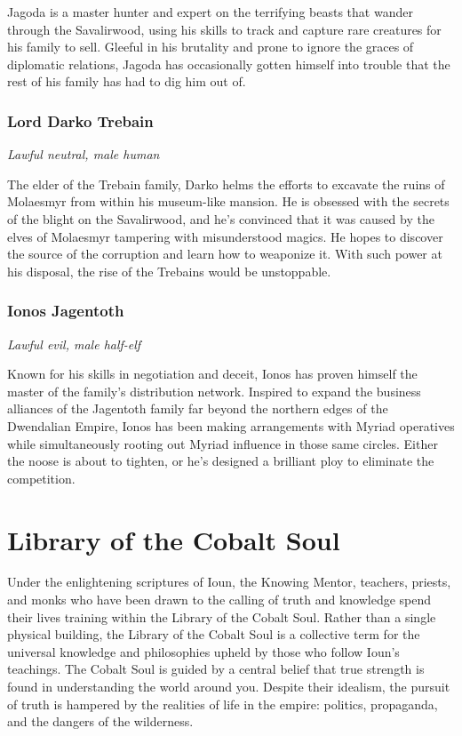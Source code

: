 \documentclass[10pt,a4paper,twoside,bg=print,twocolumn,openany,nodeprecatedcode]{dndbook}
\begin{document}
Jagoda is a master hunter and expert on the terrifying beasts that wander through the Savalirwood, using his skills to track and capture rare creatures for his family to sell. Gleeful in his brutality and prone to ignore the graces of diplomatic relations, Jagoda has occasionally gotten himself into trouble that the rest of his family has had to dig him out of.

\subsubsection{Lord Darko Trebain}
\textit{Lawful neutral, male human}

The elder of the Trebain family, Darko helms the efforts to excavate the ruins of Molaesmyr from within his museum-like mansion. He is obsessed with the secrets of the blight on the Savalirwood, and he's convinced that it was caused by the elves of Molaesmyr tampering with misunderstood magics. He hopes to discover the source of the corruption and learn how to weaponize it. With such power at his disposal, the rise of the Trebains would be unstoppable.

\subsubsection{Ionos Jagentoth}
\textit{Lawful evil, male half-elf}

Known for his skills in negotiation and deceit, Ionos has proven himself the master of the family's distribution network. Inspired to expand the business alliances of the Jagentoth family far beyond the northern edges of the Dwendalian Empire, Ionos has been making arrangements with Myriad operatives while simultaneously rooting out Myriad influence in those same circles. Either the noose is about to tighten, or he's designed a brilliant ploy to eliminate the competition.

\section{Library of the Cobalt Soul}
Under the enlightening scriptures of Ioun, the Knowing Mentor, teachers, priests, and monks who have been drawn to the calling of truth and knowledge spend their lives training within the Library of the Cobalt Soul. Rather than a single physical building, the Library of the Cobalt Soul is a collective term for the universal knowledge and philosophies upheld by those who follow Ioun's teachings. The Cobalt Soul is guided by a central belief that true strength is found in understanding the world around you. Despite their idealism, the pursuit of truth is hampered by the realities of life in the empire: politics, propaganda, and the dangers of the wilderness.
\end{document}
